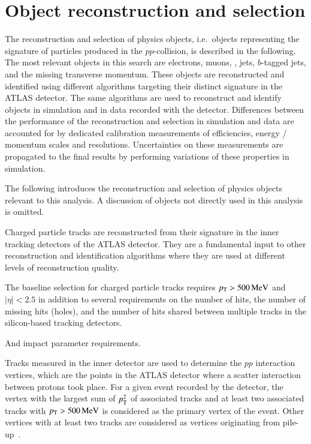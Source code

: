 \section{Object reconstruction and selection}
\label{sec:object_reconstruction}

The reconstruction and selection of physics objects, i.e.\ objects
representing the signature of particles produced in the
$pp$-collision, is described in the following. The most relevant
objects in this search are electrons, muons, \tauhadvis, jets,
$b$-tagged jets, and the missing transverse momentum. These objects
are reconstructed and identified using different algorithms targeting
their distinct signature in the ATLAS detector. The same algorithms
are used to reconstruct and identify objects in simulation and in data
recorded with the detector.  Differences between the performance of
the reconstruction and selection in simulation and data are accounted
for by dedicated calibration measurements of efficiencies, energy /
momentum scales and resolutions. Uncertainties on these measurements
are propagated to the final results by performing variations of these
properties in simulation.

The following introduces the reconstruction and selection of physics
objects relevant to this analysis. A discussion of objects not
directly used in this analysis is omitted.




Charged particle tracks are reconstructed from their signature in the
inner tracking detectors of the ATLAS detector. They are a fundamental
input to other reconstruction and identification algorithms where they
are used at different levels of reconstruction quality.

The baseline selection for charged particle tracks requires
$p_{\text{T}} > \SI{500}{\ensuremath{\text{MeV}}}$ and $|\eta| < \num{2.5}$ in addition to several
requirements on the number of hits, the number of missing hits
(holes), and the number of hits shared between multiple tracks in the
silicon-based tracking detectors.

And impact parameter requirements.

\cite{PERF-2015-08}

Tracks measured in the inner detector are used to determine the $pp$
interaction vertices, which are the points in the ATLAS detector where
a scatter interaction between protons took place. For a given event
recorded by the detector, the vertex with the largest sum of $p_{\text{T}}^2$
of associated tracks and at least two associated tracks with
$p_{\text{T}} > \SI{500}{\ensuremath{\text{MeV}}}$ is considered as the primary vertex of the
event. Other vertices with at least two tracks are considered as
vertices originating from pile-up~\cite{PERF-2015-01}.

